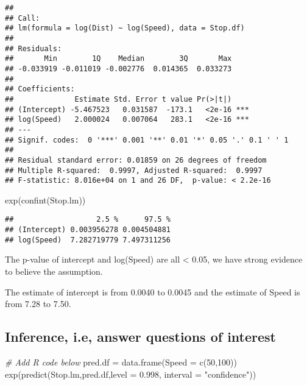 \documentclass[
]{article}
\newenvironment{Shaded}{\begin{snugshade}}{\end{snugshade}}
\newcommand{\AttributeTok}[1]{\textcolor[rgb]{0.77,0.63,0.00}{#1}}
\newcommand{\CommentTok}[1]{\textcolor[rgb]{0.56,0.35,0.01}{\textit{#1}}}
\newcommand{\DecValTok}[1]{\textcolor[rgb]{0.00,0.00,0.81}{#1}}
\newcommand{\FloatTok}[1]{\textcolor[rgb]{0.00,0.00,0.81}{#1}}
\newcommand{\FunctionTok}[1]{\textcolor[rgb]{0.00,0.00,0.00}{#1}}
\newcommand{\NormalTok}[1]{#1}
\newcommand{\OtherTok}[1]{\textcolor[rgb]{0.56,0.35,0.01}{#1}}
\newcommand{\StringTok}[1]{\textcolor[rgb]{0.31,0.60,0.02}{#1}}
\begin{document}
\begin{verbatim}
## 
## Call:
## lm(formula = log(Dist) ~ log(Speed), data = Stop.df)
## 
## Residuals:
##       Min        1Q    Median        3Q       Max 
## -0.033919 -0.011019 -0.002776  0.014365  0.033273 
## 
## Coefficients:
##              Estimate Std. Error t value Pr(>|t|)    
## (Intercept) -5.467523   0.031587  -173.1   <2e-16 ***
## log(Speed)   2.000024   0.007064   283.1   <2e-16 ***
## ---
## Signif. codes:  0 '***' 0.001 '**' 0.01 '*' 0.05 '.' 0.1 ' ' 1
## 
## Residual standard error: 0.01859 on 26 degrees of freedom
## Multiple R-squared:  0.9997, Adjusted R-squared:  0.9997 
## F-statistic: 8.016e+04 on 1 and 26 DF,  p-value: < 2.2e-16
\end{verbatim}

\begin{Shaded}
\begin{Highlighting}[]
\FunctionTok{exp}\NormalTok{(}\FunctionTok{confint}\NormalTok{(Stop.lm))}
\end{Highlighting}
\end{Shaded}

\begin{verbatim}
##                   2.5 %      97.5 %
## (Intercept) 0.003956278 0.004504881
## log(Speed)  7.282719779 7.497311256
\end{verbatim}

The p-value of intercept and log(Speed) are all \textless{} 0.05, we
have strong evidence to believe the assumption.

The estimate of intercept is from 0.0040 to 0.0045 and the estimate of
Speed is from 7.28 to 7.50.

\hypertarget{inference-i.e-answer-questions-of-interest}{%
\subsection{Inference, i.e, answer questions of
interest}\label{inference-i.e-answer-questions-of-interest}}

\begin{Shaded}
\begin{Highlighting}[]
\CommentTok{\# Add R code below}
\NormalTok{pred.df }\OtherTok{=} \FunctionTok{data.frame}\NormalTok{(}\AttributeTok{Speed =} \FunctionTok{c}\NormalTok{(}\DecValTok{50}\NormalTok{,}\DecValTok{100}\NormalTok{))}
\FunctionTok{exp}\NormalTok{(}\FunctionTok{predict}\NormalTok{(Stop.lm,pred.df,}\AttributeTok{level =} \FloatTok{0.998}\NormalTok{, }\AttributeTok{interval =} \StringTok{"confidence"}\NormalTok{))}
\end{Highlighting}
\end{Shaded}
\end{document}
